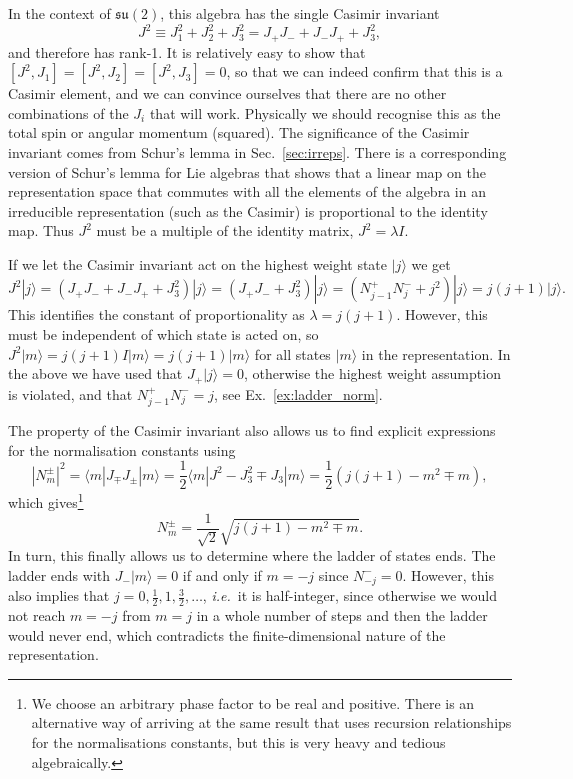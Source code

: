 \documentclass[notes.tex]{subfiles}
\begin{document}
In the context of $\mathfrak{su}(2)$, this algebra has the single Casimir invariant
\[ J^2\equiv J_1^2+J_2^2+J_3^2=J_+J_-+J_-J_++J_3^2, \]
and therefore has rank-1. It is relatively easy to show that $[J^2,J_1]=[J^2,J_2]=[J^2,J_3]=0$, so that we can indeed confirm that this is a Casimir element, and we can convince ourselves that there are no other combinations of the $J_i$ that will work. Physically we should recognise this as the total spin or angular momentum (squared). The significance of the Casimir invariant comes from Schur's lemma in Sec.~\ref{sec:irreps}. There is a corresponding version of Schur's lemma for Lie algebras that shows that a linear map on the representation space that commutes with all the elements of the algebra in an irreducible representation (such as the Casimir) is proportional to the identity map. Thus $J^2$ must be a multiple of the identity matrix, $J^2=\lambda I$.

If we let the Casimir invariant act on the highest weight state $|j\rangle$ we get
\[ J^2 |j\rangle=(J_+J_-+J_-J_++J_3^2) |j\rangle=(J_+J_-+J_3^2) |j\rangle=(N_{j-1}^+N_j^-+j^2) |j\rangle=j(j+1) |j\rangle. \]
This identifies the constant of proportionality as $\lambda = j(j+1)$. However, this must be independent of which state is acted on, so $J^2|m\rangle=j(j+1)I|m\rangle=j(j+1)|m\rangle$ for all states $|m\rangle$ in the representation.
In the above we have used  that $J_+|j\rangle=0$, otherwise the highest weight assumption is violated, and that $N_{j-1}^+N_j^-=j$, see Ex.~\ref{ex:ladder_norm}.

The property of the Casimir invariant also allows us to find explicit expressions for the normalisation constants using
\[|N_m^\pm|^2= \langle m|J_\mp J_\pm |m\rangle
= \frac{1}{2}\langle m| J^2-J_3^2\mp J_3 |m\rangle=\frac{1}{2}( j(j+1)-m^2\mp m),  \]
which gives\footnote{We choose an arbitrary phase factor to be real and positive. There is an alternative way of arriving at the same result that uses recursion relationships for the normalisations constants, but this is very heavy and tedious algebraically.}
\begin{equation*}
N^\pm_m = \frac{1}{\sqrt{2}}\sqrt{ j(j+1)-m^2\mp m }.
\end{equation*}
In turn, this finally allows us to determine where the ladder of states ends. The ladder ends with $J_-|m\rangle=0$ if and only if $m=-j$ since $N_{-j}^-=0$. However, this also implies that $j=0,\frac{1}{2},1,\frac{3}{2},\ldots$, {\it i.e.}\ it is half-integer, since otherwise we would not reach $m=-j$ from $m=j$ in a whole number of steps and then the ladder would never end, which contradicts the finite-dimensional nature of the representation.
\end{document}
